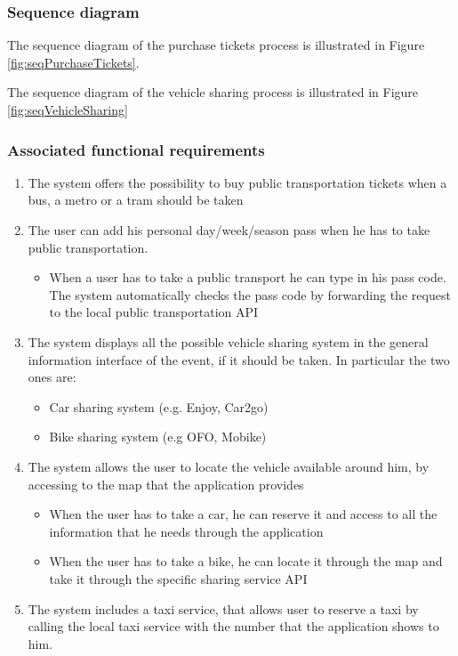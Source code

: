\subsubsection{Sequence diagram}
The sequence diagram of the purchase tickets process is illustrated in Figure \ref{fig:seqPurchaseTickets}.

The sequence diagram of the vehicle sharing process is illustrated in Figure \ref{fig:seqVehicleSharing}

\subsubsection{Associated functional requirements}
\begin{enumerate}
	\item The system offers the possibility to buy public transportation tickets when a bus, a metro or a tram should be taken
	\item The user can add his personal day/week/season pass when he has to take public transportation.
	\begin{itemize}
		\item When a user has to take a public transport he can type in his pass code. The system automatically checks the pass code by forwarding the request to the local public transportation API
	\end{itemize}
	\item The system displays all the possible vehicle sharing system in the general information interface of the event, if it should be taken. In particular the two ones are:
	\begin{itemize}
		\item Car sharing system (e.g. Enjoy, Car2go)
		\item Bike sharing system (e.g OFO, Mobike)
	\end{itemize}
	\item The system allows the user to locate the vehicle available around him, by accessing to the map that the application provides
	\begin{itemize}
		\item When the user has to take a car, he can reserve it and access to all the information that he needs through the application
		\item When the user has to take a bike, he can locate it through the map and take it through the specific sharing service API
	\end{itemize}
	\item The system includes a taxi service, that allows user to reserve a taxi by calling the local taxi service with the number that the application shows to him.
\end{enumerate}


